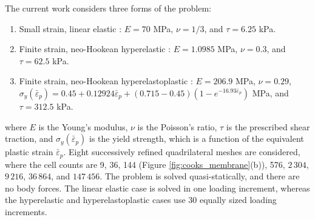 \documentclass[sn-mathphys,Numbered]{sn-jnl}%
\begin{document}
The current work considers three forms of the problem:
\begin{enumerate}[label=\roman*.]
	\item Small strain, linear elastic \cite{Zienkiewicz2000, Simplas}: $E=70$ MPa, $\nu=1/3$, and $\tau = 6.25$ kPa.
	\item Finite strain, neo-Hookean hyperelastic \cite{Pelteret2018}: $E=1.0985$ MPa, $\nu=0.3$, and $\tau = 62.5$ kPa.
	\item Finite strain, neo-Hookean hyperelastoplastic \citep{Simo1992, Simplas, Cesar2001}: $E=206.9$ MPa, $\nu=0.29$, $\sigma_y(\bar{\varepsilon}_p) = 0.45 + 0.12924\bar{\varepsilon}_p + (0.715 - 0.45)(1- e^{-16.93\bar{\varepsilon}_p})$ MPa, and $\tau = 312.5$ kPa.
\end{enumerate}
where $E$ is the Young's modulus, $\nu$ is the Poisson's ratio, $\tau$ is the prescribed shear traction, and $\sigma_y(\bar{\varepsilon}_p)$ is the yield strength, which is a function of the equivalent plastic strain $\bar{\varepsilon}_p$.
Eight successively refined quadrilateral meshes are considered, where the cell counts are 9, 36, 144 (Figure \ref{fig:cooks_membrane}(b)), 576, $2\,304$, $9\,216$, $36\,864$, and $147\,456$.
The problem is solved quasi-statically, and there are no body forces.
The linear elastic case is solved in one loading increment, whereas the hyperelastic and hyperelastoplastic cases use 30 equally sized loading increments.
\end{document}
